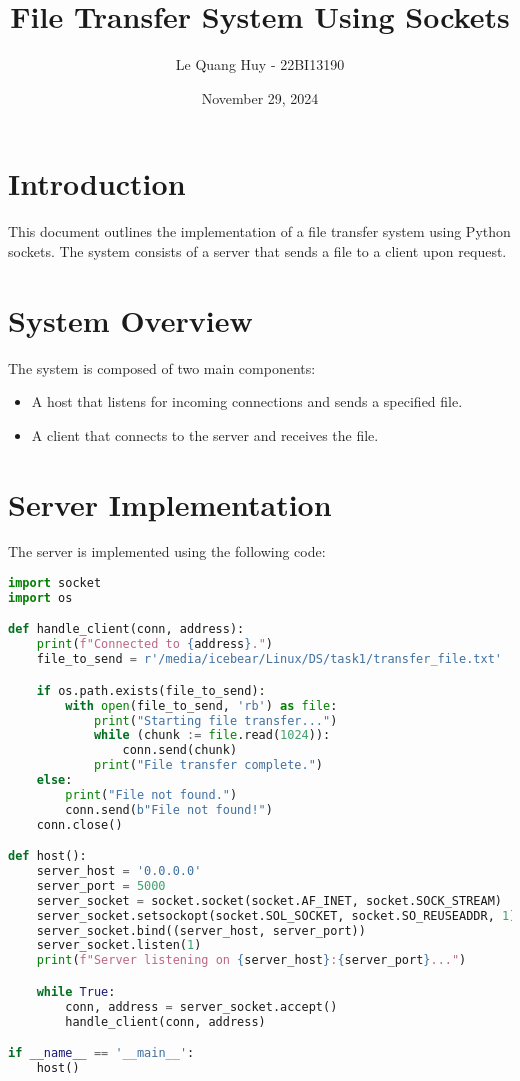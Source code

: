 \documentclass{article}
\title{File Transfer System Using Sockets}
\author{Le Quang Huy - 22BI13190}
\date{November 29, 2024}
\begin{document}
\maketitle

\section{Introduction}
This document outlines the implementation of a file transfer system using Python sockets. The system consists of a server that sends a file to a client upon request.

\section{System Overview}
The system is composed of two main components:
\begin{itemize}
    \item A host that listens for incoming connections and sends a specified file.
    \item A client that connects to the server and receives the file.
\end{itemize}

\section{Server Implementation}
The server is implemented using the following code:

\begin{lstlisting}[language=Python, caption=Host Code]
import socket
import os

def handle_client(conn, address):
    print(f"Connected to {address}.")
    file_to_send = r'/media/icebear/Linux/DS/task1/transfer_file.txt'

    if os.path.exists(file_to_send):
        with open(file_to_send, 'rb') as file:
            print("Starting file transfer...")
            while (chunk := file.read(1024)):
                conn.send(chunk)
            print("File transfer complete.")
    else:
        print("File not found.")
        conn.send(b"File not found!")
    conn.close()

def host():
    server_host = '0.0.0.0'
    server_port = 5000
    server_socket = socket.socket(socket.AF_INET, socket.SOCK_STREAM)
    server_socket.setsockopt(socket.SOL_SOCKET, socket.SO_REUSEADDR, 1)
    server_socket.bind((server_host, server_port))
    server_socket.listen(1)
    print(f"Server listening on {server_host}:{server_port}...")

    while True:
        conn, address = server_socket.accept()
        handle_client(conn, address)

if __name__ == '__main__':
    host()
\end{lstlisting}
\end{document}
